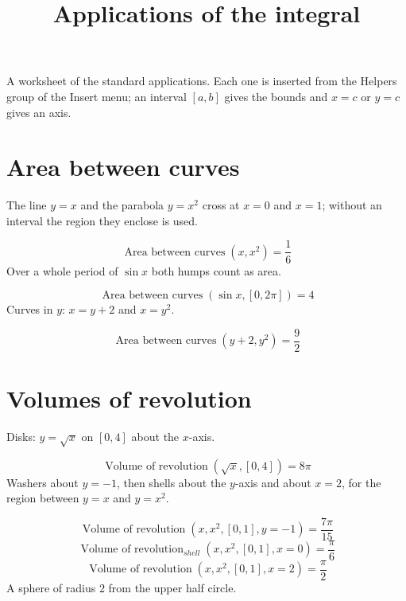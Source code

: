 \documentclass[11pt,a4paper]{article}
\title{Applications of the integral}
\date{}
\theoremstyle{plain}
\theoremstyle{definition}
\theoremstyle{remark}
\begin{document}
\maketitle
A worksheet of the standard applications. Each one is inserted from the Helpers group of the Insert menu; an interval $[a, b]$ gives the bounds and $x = c$ or $y = c$ gives an axis.

\section*{Area between curves}

The line $y = x$ and the parabola $y = x^2$ cross at $x = 0$ and $x = 1$; without an interval the region they enclose is used.

\begin{equation*}
  \operatorname{Area\ between\ curves}(x, x^2) = \frac{1}{6}
\end{equation*}
Over a whole period of $\sin x$ both humps count as area.

\begin{equation*}
  \operatorname{Area\ between\ curves}(\sin x, [0, 2\pi]) = 4
\end{equation*}
Curves in $y$: $x = y + 2$ and $x = y^2$.

\begin{equation*}
  \operatorname{Area\ between\ curves}(y + 2, y^2) = \frac{9}{2}
\end{equation*}
\section*{Volumes of revolution}

Disks: $y = \sqrt{x}$ on $[0, 4]$ about the $x$-axis.

\begin{equation*}
  \operatorname{Volume\ of\ revolution}(\sqrt{x}, [0, 4]) = 8 \pi
\end{equation*}
Washers about $y = -1$, then shells about the $y$-axis and about $x = 2$, for the region between $y = x$ and $y = x^2$.

\begin{equation*}
  \operatorname{Volume\ of\ revolution}(x, x^2, [0, 1], y = -1) = \frac{7 \pi}{15}
\end{equation*}
\begin{equation*}
  \operatorname{Volume\ of\ revolution}_{shell}(x, x^2, [0, 1], x = 0) = \frac{\pi}{6}
\end{equation*}
\begin{equation*}
  \operatorname{Volume\ of\ revolution}(x, x^2, [0, 1], x = 2) = \frac{\pi}{2}
\end{equation*}
A sphere of radius $2$ from the upper half circle.
\end{document}
